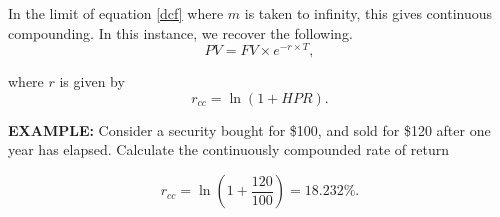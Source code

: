 \documentclass[../notes_compiled.tex]{subfiles}
\begin{document}
\begin{itemize}
\item[] In the limit of equation \ref{dcf} where $m$ is taken to infinity, this gives continuous compounding. In this instance, we recover the following.
\begin{equation}
PV = FV \times e^{-r\times T},
\end{equation}
\item[] where $r$ is given by
\begin{equation}
r_{cc}=\ln(1+HPR).
\end{equation}
{\color{RedViolet}
\item[] \textbf{EXAMPLE:} Consider a security bought for \$100, and sold for \$120 after one year has elapsed. Calculate the continuously compounded rate of return
}
{\color{RoyalBlue}
\begin{equation*}
r_{cc} = \ln\left(1+\frac{120}{100}\right) = 18.232\%.
\end{equation*}
}

\end{itemize}
\end{document}
